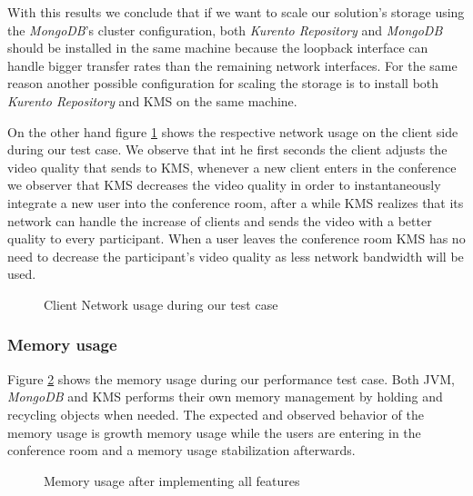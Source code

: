 With this results we conclude that if we want to scale our solution's storage using the \emph{MongoDB}'s cluster configuration, both \emph{Kurento Repository} and \emph{MongoDB} should be installed in the same machine because the loopback interface can handle bigger transfer rates than the remaining network interfaces. For the same reason another possible configuration for scaling the storage is to install both \emph{Kurento Repository} and \ac{KMS} on the same machine.

On the other hand figure \ref{fig:test_client_net} shows the respective network usage on the client side during our test case. We observe that int he first seconds the client adjusts the video quality that sends to \ac{KMS}, whenever a new client enters in the conference we observer that \ac{KMS} decreases the video quality in order to instantaneously integrate a new user into the conference room, after a while \ac{KMS} realizes that its network can handle the increase of clients and sends the video with a better quality to every participant. When a user leaves the conference room \ac{KMS} has no need to decrease the participant's video quality as less network bandwidth will be used.

  \begin{figure}[!htb]
  \begin{center}
    
  \end{center}
  \caption{Client Network usage during our test case}
  \label{fig:test_client_net}
\end{figure}

\subsubsection{Memory usage}


Figure \ref{fig:test_full_features_mem} shows the memory usage during our performance test case. Both \ac{JVM}, \emph{MongoDB} and \ac{KMS} performs their own memory management by holding and recycling objects when needed. The expected and observed behavior of the memory usage is growth memory usage while the users are entering in the conference room and a memory usage stabilization afterwards.


\begin{figure}[!htb]
  \begin{center}
    
  \end{center}
  \caption{Memory usage after implementing all features}
  \label{fig:test_full_features_mem}
\end{figure}

